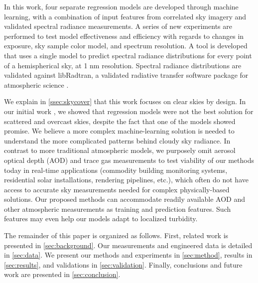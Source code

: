 In this work, four separate regression models are developed through machine learning, with a combination of input features from correlated sky imagery and validated spectral radiance measurements. A series of new experiments are performed to test model effectiveness and efficiency with regards to changes in exposure, sky sample color model, and spectrum resolution. A tool is developed that uses a single model to predict spectral radiance distributions for every point of a hemispherical sky, at 1 nm resolution. Spectral radiance distributions are validated against libRadtran, a validated radiative transfer software package for atmospheric science \citep{emde_libradtran, buras_2011, mayer_2005, kylling_1995, dahlback_1991, stamnes_1988}.

We explain in \autoref{ssec:skycover} that this work focuses on clear skies by design. In our initial work \citep{delrocco_spie}, we showed that regression models were not the best solution for scattered and overcast skies, despite the fact that one of the models showed promise. We believe a more complex machine-learning solution is needed to understand the more complicated patterns behind cloudy sky radiance. In contrast to more traditional atmospheric models, we purposely omit aerosol optical depth (AOD) and trace gas measurements to test viability of our methods today in real-time applications (commodity building monitoring systems, residential solar installations, rendering pipelines, etc.), which often do not have access to accurate sky measurements needed for complex physically-based solutions. Our proposed methods can accommodate readily available AOD and other atmospheric measurements as training and prediction features. Such features may even help our models adapt to localized turbidity.


The remainder of this paper is organized as follows. First, related work is presented in \autoref{sec:background}. Our measurements and engineered data is detailed in \autoref{sec:data}. We present our methods and experiments in \autoref{sec:method}, results in \autoref{sec:results}, and validations in \autoref{sec:validation}. Finally, conclusions and future work are presented in \autoref{sec:conclusion}. 

